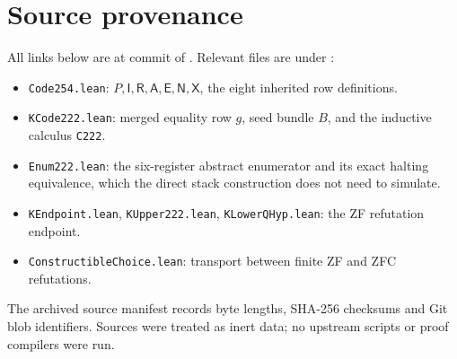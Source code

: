 \documentclass[11pt]{article}
\newcommand{\Imp}{\mathsf I}
\newcommand{\Rel}{\mathsf R}
\newcommand{\All}{\mathsf A}
\newcommand{\Eq}{\mathsf E}
\newcommand{\Neg}{\mathsf N}
\newcommand{\Ex}{\mathsf X}
\begin{document}
\section{Source provenance}
All links below are at commit
 of
. Relevant files are under
:
\begin{itemize}
 \item \texttt{Code254.lean}: \(P,\Imp,\Rel,\All,\Eq,\Neg,\Ex\),
       the eight inherited row definitions.
 \item \texttt{KCode222.lean}: merged equality row \(g\), seed bundle
       \(B\), and the inductive calculus \texttt{C222}.
 \item \texttt{Enum222.lean}: the six-register abstract enumerator and
       its exact halting equivalence, which the direct stack construction
       does not need to simulate.
 \item \texttt{KEndpoint.lean}, \texttt{KUpper222.lean},
       \texttt{KLowerQHyp.lean}: the ZF refutation endpoint.
 \item \texttt{ConstructibleChoice.lean}: transport between finite ZF
       and ZFC refutations.
\end{itemize}
The archived source manifest records byte lengths, SHA-256 checksums and
Git blob identifiers. Sources were treated as inert data; no upstream
scripts or proof compilers were run.
\end{document}
